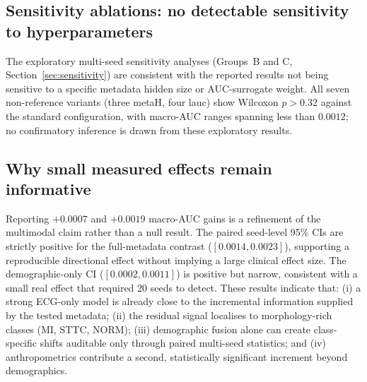 \documentclass[mathematics,article,pdftex]{Definitions/mdpi}
\begin{document}
\subsection{Sensitivity ablations: no detectable sensitivity to hyperparameters}
The exploratory multi-seed sensitivity analyses (Groups~B and C, Section~\ref{sec:sensitivity}) are consistent with the reported results not being sensitive to a specific metadata hidden size or AUC-surrogate weight. All seven non-reference variants (three metaH, four lauc) show Wilcoxon $p{>}0.32$ against the standard configuration, with macro-AUC ranges spanning less than $0.0012$; no confirmatory inference is drawn from these exploratory results.

\subsection{Why small measured effects remain informative}
Reporting $+0.0007$ and $+0.0019$ macro-AUC gains is a refinement of the multimodal claim rather than a null result. The paired seed-level 95\% CIs are strictly positive for the full-metadata contrast ($[0.0014, 0.0023]$), supporting a reproducible directional effect without implying a large clinical effect size. The demographic-only CI ($[0.0002, 0.0011]$) is positive but narrow, consistent with a small real effect that required 20 seeds to detect. These results indicate that: (i) a strong ECG-only model is already close to the incremental information supplied by the tested metadata; (ii) the residual signal localises to morphology-rich classes (MI, STTC, NORM); (iii) demographic fusion alone can create class-specific shifts auditable only through paired multi-seed statistics; and (iv) anthropometrics contribute a second, statistically significant increment beyond demographics.
\end{document}
